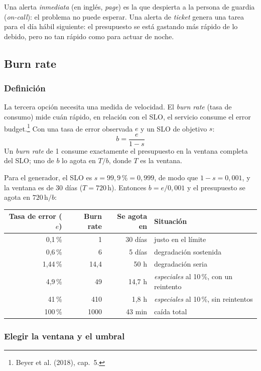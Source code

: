 \documentclass[variant=apuntes,cover=institutional,mode=screen]{ua-engineering-v6-article}
\begin{document}
Una alerta \emph{inmediata} (en inglés, \emph{page}) es la que despierta a la persona de guardia (\emph{on-call}): el problema no puede esperar. Una alerta de \emph{ticket} genera una tarea para el día hábil siguiente: el presupuesto se está gastando más rápido de lo debido, pero no tan rápido como para actuar de noche.

\subsection{Burn rate}\label{sec:burn-rate}

\subsubsection{Definición}

La tercera opción necesita una medida de velocidad. El \emph{burn rate} (tasa de consumo) mide cuán rápido, en relación con el SLO, el servicio consume el error budget.\footnote{Beyer et al. (2018), cap.~5.} Con una tasa de error observada $e$ y un SLO de objetivo $s$:
\[
b = \frac{e}{1 - s}
\]
Un \emph{burn rate} de 1 consume exactamente el presupuesto en la ventana completa del SLO; uno de $b$ lo agota en $T/b$, donde $T$ es la ventana.

Para el generador, el SLO es $s = 99{,}9\,\% = 0{,}999$, de modo que $1 - s = 0{,}001$, y la ventana es de 30 días ($T = 720$\,h). Entonces $b = e / 0{,}001$ y el presupuesto se agota en $720\,\text{h} / b$:

\begin{center}
\begin{tabular}{rrrl}
\toprule
\textbf{Tasa de error ($e$)} & \textbf{Burn rate} & \textbf{Se agota en} & \textbf{Situación} \\
\midrule
0,1\,\% & 1 & 30 días & justo en el límite \\
0,6\,\% & 6 & 5 días & degradación sostenida \\
1,44\,\% & 14,4 & 50 h & degradación seria \\
4,9\,\% & 49 & 14,7 h & \emph{especiales} al 10\,\%, con un reintento \\
41\,\% & 410 & 1,8 h & \emph{especiales} al 10\,\%, sin reintentos \\
100\,\% & 1000 & 43 min & caída total \\
\bottomrule
\end{tabular}
\end{center}

\subsubsection{Elegir la ventana y el umbral}
\end{document}
